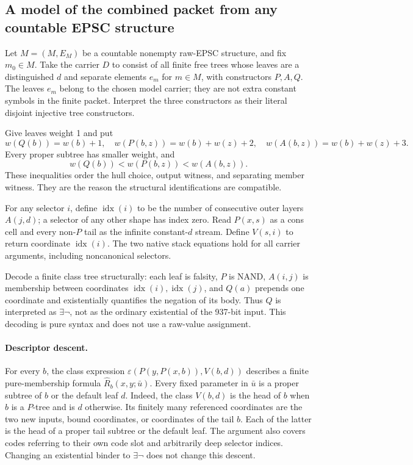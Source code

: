 \subsection{A model of the combined packet from any countable EPSC structure}

Let $M=(M,E_M)$ be a countable nonempty raw-EPSC structure, and fix
$m_0\in M$.  Take the carrier $D$ to consist of all finite free trees
whose leaves are a distinguished $d$ and separate elements $e_m$ for
$m\in M$, with constructors $P,A,Q$.  The leaves $e_m$ belong to the
chosen model carrier; they are not extra constant symbols in the
finite packet.  Interpret the three constructors as their literal
disjoint injective tree constructors.

Give leaves weight 1 and put
\begin{equation}
 w(Q(b))=w(b)+1,\quad
 w(P(b,z))=w(b)+w(z)+2,\quad
 w(A(b,z))=w(b)+w(z)+3.
 \label{eq:704-weight}
\end{equation}
Every proper subtree has smaller weight, and
\[
               w(Q(b))<w(P(b,z))<w(A(b,z)).
\]
These inequalities order the hull choice, output witness, and separating
member witness.  They are the reason the structural identifications
are compatible.

For any selector $i$, define $\operatorname{idx}(i)$ to be the number
of consecutive outer layers $A(j,d)$; a selector of any other shape
has index zero.  Read $P(x,s)$ as a cons cell and every non-$P$ tail
as the infinite constant-$d$ stream.  Define $V(s,i)$ to return
coordinate $\operatorname{idx}(i)$.  The two native stack equations
hold for all carrier arguments, including noncanonical selectors.

Decode a finite class tree structurally: each leaf is falsity, $P$
is NAND, $A(i,j)$ is membership between coordinates
$\operatorname{idx}(i),\operatorname{idx}(j)$, and $Q(a)$ prepends
one coordinate and existentially quantifies the negation of its body.
Thus $Q$ is interpreted as $\exists\neg$, not as the ordinary
existential of the 937-bit input.  This decoding is pure syntax and
does not use a raw-value assignment.

\paragraph{Descriptor descent.}
For every $b$, the class expression
$\varepsilon(P(y,P(x,b)),V(b,d))$ describes a finite pure-membership
formula $\widehat R_b(x,y;\bar u)$.  Every fixed parameter in
$\bar u$ is a proper subtree of $b$ or the default leaf $d$.
Indeed, the class $V(b,d)$ is the head of $b$ when $b$ is a $P$-tree
and is $d$ otherwise.  Its finitely many referenced coordinates are
the two new inputs, bound coordinates, or coordinates of the tail
$b$.  Each of the latter is the head of a proper tail subtree or the
default leaf.  The argument also covers codes referring to their own
code slot and arbitrarily deep selector indices.  Changing an
existential binder to $\exists\neg$ does not change this descent.

